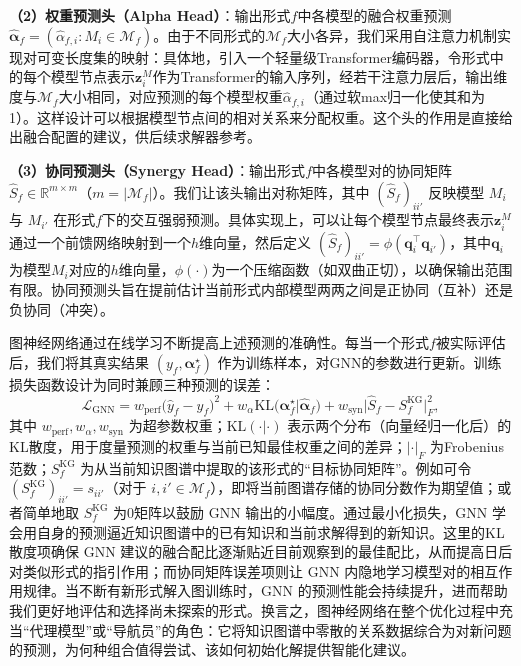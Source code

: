 \documentclass[../main.tex]{subfiles}
\begin{document}
\textbf{（2）权重预测头（Alpha Head）}：输出形式$f$中各模型的融合权重预测$\hat{\boldsymbol{\alpha}}_f = (\hat{\alpha}_{f,i}: M_i \in \mathcal{M}_f)$。由于不同形式的$\mathcal{M}_f$大小各异，我们采用自注意力机制实现对可变长度集的映射：具体地，引入一个轻量级Transformer编码器，令形式中的每个模型节点表示$\mathbf{z}^M_i$作为Transformer的输入序列，经若干注意力层后，输出维度与$\mathcal{M}_f$大小相同，对应预测的每个模型权重$\hat{\alpha}_{f,i}$（通过软max归一化使其和为1）。这样设计可以根据模型节点间的相对关系来分配权重。这个头的作用是直接给出融合配置的建议，供后续求解器参考。

\textbf{（3）协同预测头（Synergy Head）}：输出形式$f$中各模型对的协同矩阵$\hat{S}_f \in \mathbb{R}^{m\times m}$（$m=|\mathcal{M}_f|$）。我们让该头输出对称矩阵，其中 $(\hat{S}_f)_{ii'}$ 反映模型 $M_i$ 与 $M_{i'}$ 在形式$f$下的交互强弱预测。具体实现上，可以让每个模型节点最终表示$\mathbf{z}^M_i$通过一个前馈网络映射到一个$h$维向量，然后定义 $(\hat{S}_f)_{ii'} = \phi(\mathbf{q}_i^\top \mathbf{q}_{i'})$，其中$\mathbf{q}_i$为模型$M_i$对应的$h$维向量，$\phi(\cdot)$为一个压缩函数（如双曲正切），以确保输出范围有限。协同预测头旨在提前估计当前形式内部模型两两之间是正协同（互补）还是负协同（冲突）。

图神经网络通过在线学习不断提高上述预测的准确性。每当一个形式$f$被实际评估后，我们将其真实结果 $(y_f, \boldsymbol{\alpha}_f^\star)$ 作为训练样本，对GNN的参数进行更新。训练损失函数设计为同时兼顾三种预测的误差：
\begin{equation}
	\mathcal{L}_{\text{GNN}} =
	w_{\text{perf}}\big(\hat{y}_f - y_f\big)^2
	+
	w_{\alpha}\text{KL}\big(\boldsymbol{\alpha}_f^\star | \hat{\boldsymbol{\alpha}}_f\big)
	+
	w_{\text{syn}}\big|\hat{S}_f - S^{\text{KG}}_f\big|_F^2,
\end{equation}
其中 $w_{\text{perf}}, w_{\alpha}, w_{\text{syn}}$ 为超参数权重；$\text{KL}(\cdot|\cdot)$ 表示两个分布（向量经归一化后）的KL散度，用于度量预测的权重与当前已知最佳权重之间的差异；$|\cdot|_F$ 为Frobenius范数；$S^{\text{KG}}_f$ 为从当前知识图谱中提取的该形式的“目标协同矩阵”。例如可令 $(S^{\text{KG}}_f)_{ii'} = s_{ii'}$（对于 $i,i'\in \mathcal{M}_f$），即将当前图谱存储的协同分数作为期望值；或者简单地取 $S^{\text{KG}}_f$ 为0矩阵以鼓励 GNN 输出的小幅度。通过最小化损失，GNN 学会用自身的预测逼近知识图谱中的已有知识和当前求解得到的新知识。这里的KL散度项确保 GNN 建议的融合配比逐渐贴近目前观察到的最佳配比，从而提高日后对类似形式的指引作用；而协同矩阵误差项则让 GNN 内隐地学习模型对的相互作用规律。当不断有新形式解入图训练时，GNN 的预测性能会持续提升，进而帮助我们更好地评估和选择尚未探索的形式。换言之，图神经网络在整个优化过程中充当“代理模型”或“导航员”的角色：它将知识图谱中零散的关系数据综合为对新问题的预测，为何种组合值得尝试、该如何初始化解提供智能化建议。
\end{document}
